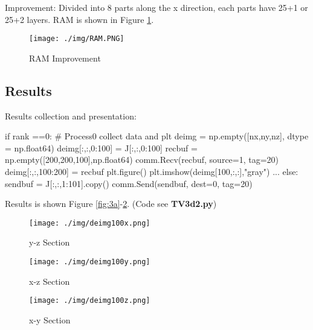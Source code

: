 \documentclass{article}
\begin{document}
Improvement: Divided into 8 parts along the x direction, each parts have 25+1 or 25+2 layers. RAM is shown in Figure \ref{fig:2}.

\begin{figure}[htp]
  \centering
  \texttt{[image: ./img/RAM.PNG]}\\
  \caption{RAM Improvement}\label{fig:2}
\end{figure}

\subsection{Results}
Results collection and presentation:
\begin{python}
  if rank ==0:
    # Process0 collect data and plt
    deimg = np.empty([nx,ny,nz], dtype = np.float64)
    deimg[:,:,0:100] = J[:,:,0:100]
    recbuf = np.empty([200,200,100],np.float64)
    comm.Recv(recbuf, source=1, tag=20)
    deimg[:,:,100:200] = recbuf
    plt.figure()
    plt.imshow(deimg[100,:,:],"gray")
    ...	
  else:
    sendbuf = J[:,:,1:101].copy()
    comm.Send(sendbuf, dest=0, tag=20)
\end{python}
Results is shown Figure \ref{fig:3a}-\ref{fig:3c}. (Code see \textbf{TV3d2.py})
\begin{figure}[htp]
\begin{minipage}{0.3\linewidth}
\centering
\texttt{[image: ./img/deimg100x.png]}
\caption{y-z Section}
\label{fig:3a}
\end{minipage}%
\begin{minipage}{0.3\linewidth}
\centering
\texttt{[image: ./img/deimg100y.png]}
\caption{x-z Section}
\label{fig:3b}
\end{minipage}
\begin{minipage}{0.3\linewidth}
\centering
\texttt{[image: ./img/deimg100z.png]}
\caption{x-y Section}
\label{fig:3c}
\end{minipage}
\end{figure}
\end{document}
